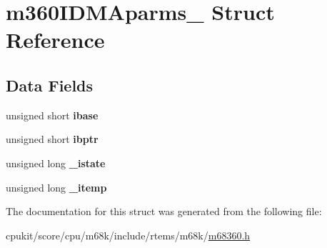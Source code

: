 \hypertarget{structm360IDMAparms__}{}\section{m360\+I\+D\+M\+Aparms\+\_\+ Struct Reference}
\label{structm360IDMAparms__}
\subsection*{Data Fields}
\begin{DoxyCompactItemize}
\item 
\mbox{\label{structm360IDMAparms___a29638b2453e295c4c8d877965ecf37c3}} 
unsigned short {\bfseries ibase}
\item 
\mbox{\label{structm360IDMAparms___a51ac0af32330d89ec4baefd5466d5653}} 
unsigned short {\bfseries ibptr}
\item 
\mbox{\label{structm360IDMAparms___a310e4df2830a4a1affd333d580344c44}} 
unsigned long {\bfseries \+\_\+istate}
\item 
\mbox{\label{structm360IDMAparms___a855278515c84d8edbe09a2b8e7b9d751}} 
unsigned long {\bfseries \+\_\+itemp}
\end{DoxyCompactItemize}


The documentation for this struct was generated from the following file\+:\begin{DoxyCompactItemize}
\item 
cpukit/score/cpu/m68k/include/rtems/m68k/\mbox{\hyperlink{m68360_8h}{m68360.\+h}}\end{DoxyCompactItemize}
